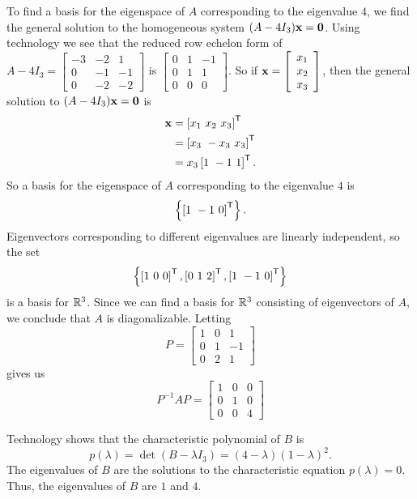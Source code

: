 \begin{example}
To find a basis for the eigenspace of $A$ corresponding to the eigenvalue $4$, we find the general solution to the homogeneous system $(A - 4I_3)\mathbf{x} = \mathbf{0}$. Using technology we see that the reduced row echelon form of $A - 4I_3 =  \left[ \begin{array}{rrr} -3&-2&1 \\ 0&-1&-1 \\ 0&-2&-2 \end{array} \right]$ is $\left[ \begin{array}{ccr} 0&1&-1 \\ 0&1&1 \\ 0&0&0 \end{array} \right]$. So if $\mathbf{x} = \left[ \begin{array}{c} x_1 \\ x_2 \\ x_3 \end{array} \right]$, then the general solution to $(A-4I_3)\mathbf{x} = \mathbf{0}$ is
\begin{align*}
\mathbf{x} &= \left[ x_1 \ x_2 \ x_3 \right]^{\mathsf{T}} \\
	&= \left[ x_3 \ -x_3 \ x_3 \right]^{\mathsf{T}} \\
	&= x_3 \left[  1\ -1 \ 1 \right]^{\mathsf{T}}.
\end{align*}
So a basis for the eigenspace of $A$ corresponding to the eigenvalue $4$ is 
\[\left\{ \left[ 1 \ -1 \ 0 \right]^{\mathsf{T}}\right\}.\]
Eigenvectors corresponding to different eigenvalues are linearly independent, so the set 
\[\left\{ \left[ 1 \ 0 \ 0 \right]^{\mathsf{T}}, \left[  0 \ 1 \ 2  \right]^{\mathsf{T}},  \left[ 1 \ -1 \ 0 \right]^{\mathsf{T}} \right\}\]
is a basis for $\mathbb{R}^3$. Since we can find a basis for $\mathbb{R}^3$ consisting of eigenvectors of $A$, we conclude that $A$ is diagonalizable. Letting 
\[P =  \left[ \begin{array}{ccr} 1&0&1 \\ 0&1&-1 \\ 0&2&1 \end{array} \right]\]
gives us
\[P^{-1}AP = \left[ \begin{array}{ccc} 1&0&0 \\ 0&1&0 \\ 0&0&4 \end{array} \right]\]


\item Technology shows that the characteristic polynomial of $B$ is
\[p(\lambda) = \det(B - \lambda I_3) = (4-\lambda)(1-\lambda)^2.\]
The eigenvalues of $B$ are the solutions to the characteristic equation $p(\lambda) = 0$. Thus, the eigenvalues of $B$ are $1$ and $4$. 


\end{example}
